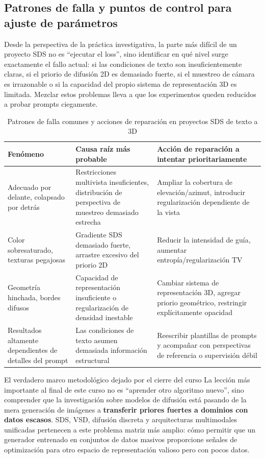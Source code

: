 \documentclass[a4paper]{article}
\begin{document}
\subsection{Patrones de falla y puntos de control para ajuste de parámetros}

Desde la perspectiva de la práctica investigativa, la parte más difícil de un proyecto SDS no es ``ejecutar el loss'', sino identificar en qué nivel surge exactamente el fallo actual: si las condiciones de texto son insuficientemente claras, si el priorio de difusión 2D es demasiado fuerte, si el muestreo de cámara es irrazonable o si la capacidad del propio sistema de representación 3D es limitada. Mezclar estos problemas lleva a que los experimentos queden reducidos a probar prompts ciegamente.

\begin{table}[H]
\centering
\begin{tabular}{p{} p{} p{}}
\toprule
Fenómeno & Causa raíz más probable & Acción de reparación a intentar prioritariamente \\
\midrule
Adecuado por delante, colapsado por detrás & Restricciones multivista insuficientes, distribución de perspectiva de muestreo demasiado estrecha & Ampliar la cobertura de elevación/azimut, introducir regularización dependiente de la vista \\
Color sobresaturado, texturas pegajosas & Gradiente SDS demasiado fuerte, arrastre excesivo del priorio 2D & Reducir la intensidad de guía, aumentar entropía/regularización TV \\
Geometría hinchada, bordes difusos & Capacidad de representación insuficiente o regularización de densidad inestable & Cambiar sistema de representación 3D, agregar priorio geométrico, restringir explícitamente opacidad \\
Resultados altamente dependientes de detalles del prompt & Las condiciones de texto asumen demasiada información estructural & Reescribir plantillas de prompts y acompañar con perspectivas de referencia o supervisión débil \\
\bottomrule
\end{tabular}
\caption{Patrones de falla comunes y acciones de reparación en proyectos SDS de texto a 3D}
\end{table}

\begin{importantbox}{El verdadero marco metodológico dejado por el cierre del curso}
La lección más importante al final de este curso no es ``aprender otro algoritmo nuevo'', sino comprender que la investigación sobre modelos de difusión está pasando de la mera generación de imágenes a \textbf{transferir priores fuertes a dominios con datos escasos}. SDS, VSD, difusión discreta y arquitecturas multimodales unificadas pertenecen a este problema matriz más amplio: cómo permitir que un generador entrenado en conjuntos de datos masivos proporcione señales de optimización para otro espacio de representación valioso pero con pocos datos.
\end{importantbox}
\end{document}
